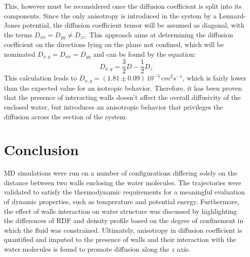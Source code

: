 \documentclass[
	12pt, %
]{fphw}
\begin{document}
This, however must be reconsidered once the diffusion coefficient is split into its components.
Since the only anisotropy is introduced in the system by a Lennard-Jones potential, the diffusion coefficient tensor will be assumed as diagonal, with the terms $D_{xx} = D_{yy} \neq D_{zz}$.
This approach aims at determining the diffusion coefficient on the directions lying on the plane not confined, which will be nominated $D_{x,y} = D_{xx} = D_{yy}$ and can be found by the equation:
\begin{equation}
	D_{x,y} = \frac{3}{2}D - \frac{1}{2}D_{z}
\end{equation}
This calculation leads to $D_{x,y} = (1.81 \pm 0.09)\, 10^{-5} \, cm^{2} s^{-1}$, which is fairly lower than the expected value for an isotropic behavior.
Therefore, it has been proven that the presence of interacting walls doesn't affect the overall diffusivity of the enclosed water, but introduces an anisotropic behavior that privileges the diffusion across the section of the system.
\section*{Conclusion}
MD simulations were run on a number of configurations differing solely on the distance between two walls enclosing the water molecules.
The trajectories were validated to satisfy the thermodynamic requirements for a meaningful evaluation of dynamic properties, such as temperature and potential energy.
Furthermore, the effect of walls interaction on water structure was discussed by highlighting the differences of RDF and density profile based on the degree of confinement in which the fluid was constrained.
Ultimately, anisotropy in diffusion coefficient is quantified and imputed to the presence of walls and their interaction with the water molecules is found to promote diffusion along the $z$ axis. 


\end{document}
